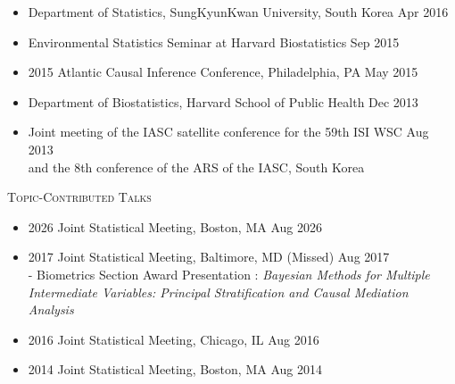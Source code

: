 \documentclass[10pt]{article}
\newenvironment{innerlist}[1][\enskip\textbullet]%
        {\begin{itemize}[#1,leftmargin=*,parsep=0pt,itemsep=0pt,topsep=0pt,partopsep=0pt]}
        {\end{itemize}}
\newcommand{\halfblankline}{\quad\vspace{-0.5\baselineskip}\pagebreak[3]}
\begin{document}
\begin{innerlist}
  \hfill Oct 2016 \\
\item[] Department of Statistics, SungKyunKwan University, South Korea
  \hfill Apr 2016 \\
\item[] Environmental Statistics Seminar at Harvard Biostatistics
  \hfill Sep 2015\\
\item[] 2015 Atlantic Causal Inference Conference, Philadelphia, PA
  \hfill May 2015 \\
\item[] Department of Biostatistics, Harvard School of Public Health
  \hfill Dec 2013 \\
\item[] Joint meeting of the IASC satellite conference for the 59th ISI WSC
  \hfill Aug 2013\\
 and the 8th conference of the ARS of the IASC, South Korea\\
\end{innerlist}

\halfblankline

\textsc{Topic-Contributed Talks}
\smallskip
\begin{innerlist}
\item[] 2026 Joint Statistical Meeting, Boston, MA
  \hfill Aug 2026\\
\item[] 2017 Joint Statistical Meeting, Baltimore, MD (Missed)
  \hfill Aug 2017\\
- Biometrics Section Award Presentation : {\it Bayesian Methods for Multiple Intermediate Variables: Principal Stratification and Causal Mediation Analysis}\\
\item[] 2016 Joint Statistical Meeting, Chicago, IL
  \hfill Aug 2016\\
\item[] 2014 Joint Statistical Meeting, Boston, MA
  \hfill Aug 2014\\
\end{innerlist}
\end{document}
